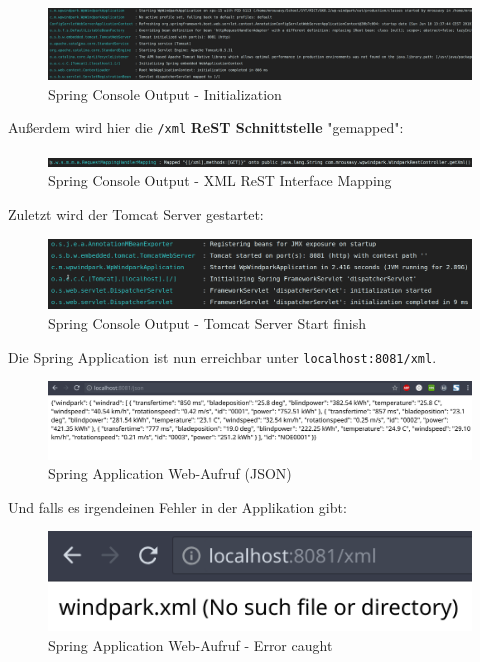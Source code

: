 \begin{figure}
    \caption{Spring Console Output - Initialization}
    \includegraphics[width=15cm]{images/spring-console-init}
    \centering
\end{figure}

Außerdem wird hier die \texttt{/xml} \textbf{ReST Schnittstelle} "gemapped":

\begin{figure}
    \caption{Spring Console Output - XML ReST Interface Mapping}
    \includegraphics[width=15cm]{images/spring-console-mapped}
    \centering
\end{figure}

Zuletzt wird der Tomcat Server gestartet:

\begin{figure}
    \caption{Spring Console Output - Tomcat Server Start finish}
    \includegraphics[width=15cm]{images/spring-console-finish}
    \centering
\end{figure}

Die Spring Application ist nun erreichbar unter \texttt{localhost:8081/xml}.

\begin{figure}
    \caption{Spring Application Web-Aufruf (JSON)}
    \includegraphics[width=15cm]{images/spring-app-json}
    \centering
\end{figure}

Und falls es irgendeinen Fehler in der Applikation gibt:

\begin{figure}
    \caption{Spring Application Web-Aufruf - Error caught}
    \includegraphics[width=15cm]{images/spring-app-filenotfound}
    \centering
\end{figure}




